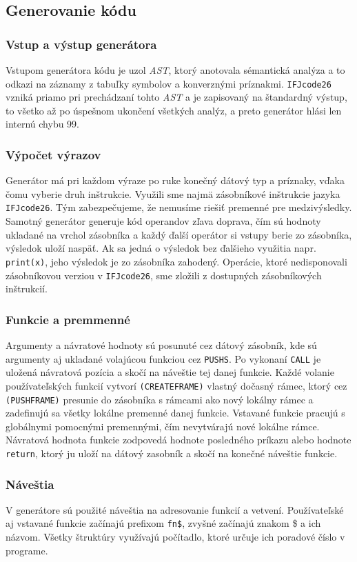 \documentclass{article}
\begin{document}
    \subsection{Generovanie kódu}
        \subsubsection{Vstup a výstup generátora}
        Vstupom generátora kódu je uzol \emph{AST}, ktorý anotovala sémantická analýza a to odkazi na záznamy z tabuľky symbolov a konverznými príznakmi. \texttt{IFJcode26} vzniká priamo pri prechádzaní tohto \emph{AST} a je zapisovaný na štandardný výstup, to všetko až po úspešnom ukončení všetkých analýz, a preto generátor hlási len internú chybu 99.
        \subsubsection{Výpočet výrazov}
        Generátor má pri každom výraze po ruke konečný dátový typ a príznaky, vďaka čomu vyberie druh inštrukcie. Využili sme najmä zásobníkové inštrukcie jazyka \texttt{IFJcode26}. Tým zabezpečujeme, že nemusíme riešiť premenné pre medzivýsledky. Samotný generátor generuje kód operandov zľava doprava, čím sú hodnoty ukladané na vrchol zásobníka a každý ďalší operátor si vstupy berie zo zásobníka, výsledok uloží naspäť. Ak sa jedná o výsledok bez ďalšieho využitia napr. \texttt{print(x)}, jeho výsledok je zo zásobníka zahodený. Operácie, ktoré nedisponovali zásobníkovou verziou v \texttt{IFJcode26}, sme zložili z dostupných zásobníkových inštrukcií.
        \subsubsection{Funkcie a premmenné}
        Argumenty a návratové hodnoty sú posunuté cez dátový zásobník, kde sú argumenty aj ukladané volajúcou funkciou cez \texttt{PUSHS}. Po vykonaní \texttt{CALL} je uložená návratová pozícia a skočí na náveštie tej danej funkcie. Každé volanie používateľských funkcií vytvorí \texttt{(CREATEFRAME)} vlastný dočasný rámec, ktorý cez \texttt{(PUSHFRAME)} presunie do zásobníka s rámcami ako nový lokálny rámec a zadefinujú sa všetky lokálne premenné danej funkcie. Vstavané funkcie pracujú s globálnymi pomocnými premennými, čím nevytvárajú nové lokálne rámce. Návratová hodnota funkcie zodpovedá hodnote posledného príkazu alebo hodnote \texttt{return}, ktorý ju uloží na dátový zasobník a skočí na konečné náveštie funkcie.
        \subsubsection{Náveštia}
        V generátore sú použité náveštia na adresovanie funkcií a vetvení. Používateľské aj vstavané funkcie začínajú prefixom \texttt{fn\$}, zvyšné začínajú znakom \$ a ich názvom. Všetky štruktúry využívajú počítadlo, ktoré určuje ich poradové číslo v programe.
\end{document}
